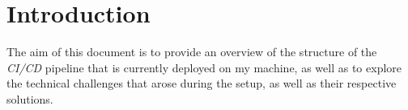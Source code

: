 \section{Introduction}
The aim of this document is to provide an overview of the structure of the \textit{CI/CD} pipeline that is currently deployed on my
machine, as well as to explore the technical challenges that arose during the setup,
as well as their respective solutions.
